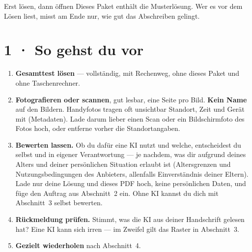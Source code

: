 \documentclass[11pt]{article}
\begin{document}

\begin{lpachtung}{Erst lösen, dann öffnen}
Dieses Paket enthält die Musterlösung. Wer es vor dem Lösen liest, misst am Ende nur, wie gut das Abschreiben gelingt.
\end{lpachtung}

\section*{1 · So gehst du vor}
\begin{enumerate}[leftmargin=*,itemsep=2pt]
\item \textbf{Gesamttest lösen} — vollständig, mit Rechenweg, ohne dieses Paket und ohne Taschenrechner.
\item \textbf{Fotografieren oder scannen}, gut lesbar, eine Seite pro Bild. \textbf{Kein Name} auf den Bildern.
  Handyfotos tragen oft unsichtbar Standort, Zeit und Gerät mit (Metadaten). Lade darum lieber einen Scan oder ein
  Bildschirmfoto des Fotos hoch, oder entferne vorher die Standortangaben.
\item \textbf{Bewerten lassen.} Ob du dafür eine KI nutzt und welche, entscheidest du selbst und in eigener Verantwortung —
  je nachdem, was dir aufgrund deines Alters und deiner persönlichen Situation erlaubt ist (Altersgrenzen und
  Nutzungsbedingungen des Anbieters, allenfalls Einverständnis deiner Eltern). Lade nur deine Lösung und dieses PDF hoch,
  keine persönlichen Daten, und füge den Auftrag aus Abschnitt~2 ein. Ohne KI kannst du dich mit Abschnitt~3 selbst bewerten.
\item \textbf{Rückmeldung prüfen.} Stimmt, was die KI aus deiner Handschrift gelesen hat? Eine KI kann sich irren —
  im Zweifel gilt das Raster in Abschnitt~3.
\item \textbf{Gezielt wiederholen} nach Abschnitt~4.
\end{enumerate}
\end{document}
